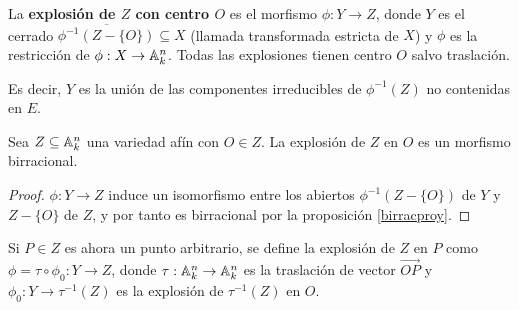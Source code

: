 \documentclass[ACGA.tex]{subfiles}
\begin{document}
\begin{defi}
 La {\bf explosión de $Z$ con centro $O$} es el morfismo $\phi:Y\to Z$, donde $Y$ es el cerrado $\overline{\phi^{-1}(Z-\{O\})}\subseteq X$ (llamada transformada estricta de $X$) y $\phi$ es la restricción de $\phi:X\to\mathbb{A}^n_k$. Todas las explosiones tienen centro $O$ salvo traslación.
\end{defi}

Es decir, $Y$ es la unión de las componentes irreducibles de $\phi^{-1}(Z)$ no contenidas en $E$. 

\begin{prop}
 Sea $Z\subseteq\mathbb{A}^n_k$ una variedad afín con $O\in Z$. La explosión de $Z$ en $O$ es un morfismo birracional.
\end{prop}

\begin{proof}
 $\phi:Y\to Z$ induce un isomorfismo entre los abiertos $\phi^{-1}(Z-\{O\})$ de $Y$ y $Z-\{O\}$ de $Z$, y por tanto es birracional por la proposición \ref{birracproy}.
\end{proof}

Si $P\in Z$ es ahora un punto arbitrario, se define la explosión de $Z$ en $P$ como $\phi=\tau\circ\phi_0:Y\to Z$, donde $\tau:\mathbb{A}^n_k\to\mathbb{A}^n_k$ es la traslación de vector $\overrightarrow{OP}$ y $\phi_0:Y\to\tau^{-1}(Z)$ es la explosión de $\tau^{-1}(Z)$ en $O$.
\end{document}
